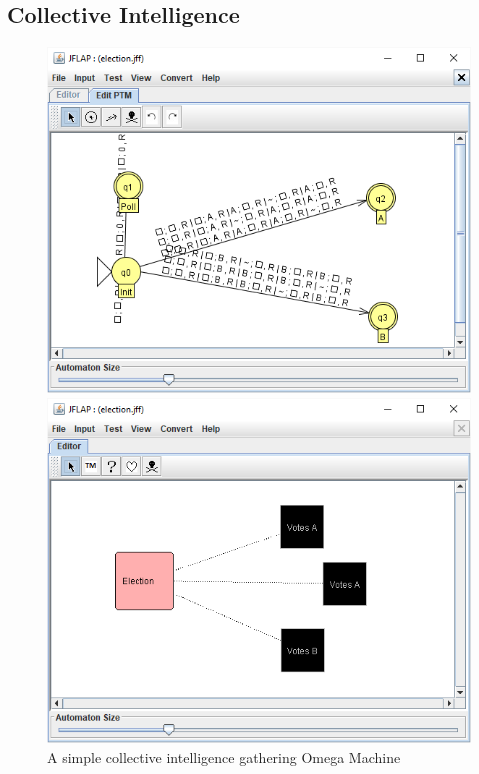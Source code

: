 \documentclass[12pt]{article}
\begin{document}
	\clearpage\subsection{Collective Intelligence}
	\begin{figure}
		\includegraphics[width=\linewidth]{scenario-col-tm}
		\smallskip\par
		\includegraphics[width=\linewidth]{scenario-col-omega}
		\caption{A simple collective intelligence gathering Omega Machine}
		\label{fig:collect}
	\end{figure}
\end{document}
